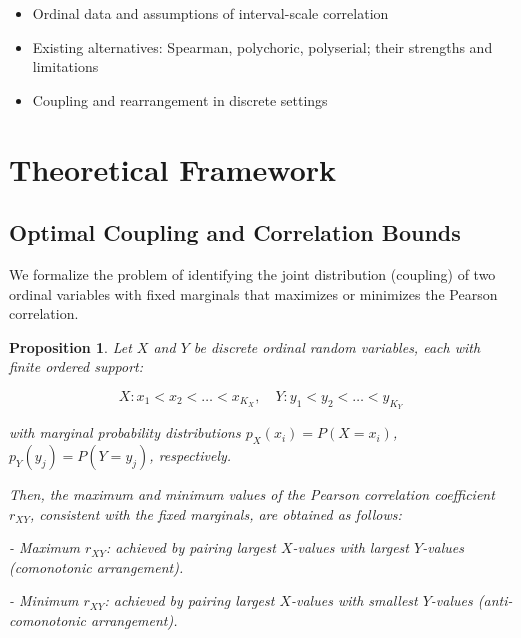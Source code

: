 \documentclass[
  12pt,
]{article}
\providecommand{\tightlist}{%
  \setlength{\itemsep}{0pt}\setlength{\parskip}{0pt}}\usepackage{longtable,booktabs,array}
\newtheorem{proposition}{Proposition}
\begin{document}
\begin{itemize}
\tightlist
\item
  Ordinal data and assumptions of interval-scale correlation\\
\item
  Existing alternatives: Spearman, polychoric, polyserial; their
  strengths and limitations\\
\item
  Coupling and rearrangement in discrete settings
\end{itemize}

\section{Theoretical Framework}\label{theoretical-framework}

\subsection{Optimal Coupling and Correlation
Bounds}\label{optimal-coupling-and-correlation-bounds}

We formalize the problem of identifying the joint distribution
(coupling) of two ordinal variables with fixed marginals that maximizes
or minimizes the Pearson correlation.

\begin{proposition}


Let $X$ and $Y$ be discrete ordinal random variables, each with finite ordered support:

$$
X: x_1 < x_2 < \dots < x_{K_X},\quad Y: y_1 < y_2 < \dots < y_{K_Y}
$$

with marginal probability distributions $p_X(x_i) = P(X = x_i)$, $p_Y(y_j) = P(Y = y_j)$, respectively.

Then, the maximum and minimum values of the Pearson correlation coefficient $r_{XY}$, consistent with the fixed marginals, are obtained as follows:

- Maximum $r_{XY}$: achieved by pairing largest $X$-values with largest $Y$-values (comonotonic arrangement).
    
- Minimum $r_{XY}$: achieved by pairing largest $X$-values with smallest $Y$-values (anti-comonotonic arrangement).
    
\end{proposition}
\end{document}
